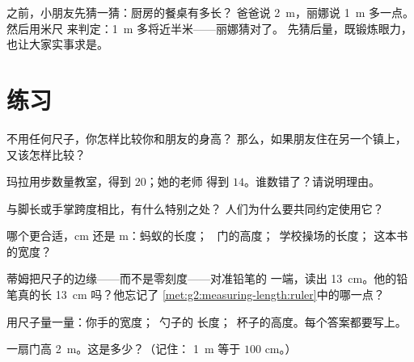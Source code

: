 \begin{example}\label{ex:g2:measuring-length:estimate}
之前，小朋友先猜一猜：厨房的餐桌有多长？
爸爸说 \qty{2}{m}，丽娜说 \qty{1}{m} 多一点。然后用米尺
来判定：\qty{1}{m} 多将近半米——丽娜猜对了。
先猜后量，既锻炼眼力，也让大家实事求是。
\end{example}

\section{练习}

\begin{exercise}[$\star$]\label{exo:g2:measuring-length:1}
不用任何尺子，你怎样比较你和朋友的身高？
那么，如果朋友住在另一个镇上，又该怎样比较？
\end{exercise}

\begin{exercise}[$\star$]\label{exo:g2:measuring-length:2}
玛拉用步数量教室，得到 $20$；她的老师
得到 $14$。谁数错了？请说明理由。
\end{exercise}

\begin{exercise}[$\star$]\label{exo:g2:measuring-length:3}
与脚长或手掌跨度相比，有什么特别之处？
人们为什么要共同约定使用它？
\end{exercise}

\begin{exercise}[$\star$]\label{exo:g2:measuring-length:4}
哪个更合适，\unit{cm} 还是 \unit{m}：蚂蚁的长度；
\ 门的高度；\ 学校操场的长度；
这本书的宽度？
\end{exercise}

\begin{exercise}[$\star$]\label{exo:g2:measuring-length:5}
蒂姆把尺子的边缘——而不是零刻度——对准铅笔的
一端，读出 \qty{13}{cm}。他的铅笔真的长
\qty{13}{cm} 吗？他忘记了
\cref{met:g2:measuring-length:ruler}中的哪一点？
\end{exercise}

\begin{exercise}[$\star$]\label{exo:g2:measuring-length:6}
用尺子量一量：你手的宽度；\ 勺子的
长度；\ 杯子的高度。每个答案都要写上。
\end{exercise}

\begin{exercise}[$\star$]\label{exo:g2:measuring-length:7}
一扇门高 \qty{2}{m}。这是多少？（记住：
\qty{1}{m} 等于 $100$ \unit{cm}。）
\end{exercise}

